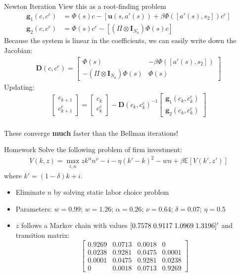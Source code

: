 \documentclass{beamer}
\begin{document}
\begin{frame}{Newton Iteration}
View this as a root-finding problem
\begin{align*}
\mathbf{g}_1(c, c^e) &= \Phi(s) c - \left[\mathbf{u}(s, a'(s)) + \beta \Phi([a'(s), s_2]) c^e \right] \\
\mathbf{g}_2(c, c^e) &= \Phi(s) c^e - \left[ (\Pi \otimes \mathbf{I}_{N_a}) \Phi (s) c \right]
\end{align*}
Because the system is linear in the coefficients, we can easily write down the Jacobian:
\begin{align*}
\mathbf{D}(c, c^e) =
\begin{bmatrix}
\Phi(s) & -\beta \Phi([a'(s), s_2]) \\
-(\Pi \otimes \mathbf{I}_{N_a}) \Phi (s) & \Phi(s)
\end{bmatrix}
\end{align*}
Updating:
\begin{align*}
\begin{bmatrix}
c_{k+1} \\
c^e_{k+1}
\end{bmatrix}
=
\begin{bmatrix}
c_{k} \\
c^e_{k}
\end{bmatrix}
- \mathbf{D}(c_k, c_k^e)^{-1}
\begin{bmatrix}
\mathbf{g}_1(c_k, c^e_k) \\
\mathbf{g}_2(c_k, c^e_k)
\end{bmatrix}
\end{align*} \\
\vspace{2mm}
These converge \textbf{much} faster than the Bellman iterations!
\end{frame}

\begin{frame}{Homework}
Solve the following problem of firm investment:
\begin{align*}
V(k, z) = \max_{i, n} z k^{\alpha} n^{\nu} - i - \eta (k' - k)^2 - wn + \beta \mathbb{E} \left[V(k', z') \right]
\end{align*}
where $k' = (1 - \delta)k + i$.
\begin{itemize}
\item Eliminate $n$ by solving static labor choice problem
\item Parameters: $w = 0.99$; $w = 1.26$; $\alpha = 0.26$; $\nu = 0.64$; $\delta = 0.07$; $\eta = 0.5$
\item $z$ follows a Markov chain with values $[0.7578 \hspace{1mm} 0.9117 \hspace{1mm} 1.0969 \hspace{1mm} 1.3196]'$ and transition matrix:
\vspace{1mm}
$$\begin{bmatrix}
 0.9269  &   0.0713  & 0.0018 & 0 \\
 0.0238  &   0.9281  & 0.0475 & 0.0001 \\
 0.0001  &   0.0475  & 0.9281 & 0.0238 \\
 0       &   0.0018  & 0.0713 & 0.9269
\end{bmatrix}$$
\end{itemize}
\end{frame}
\end{document}
